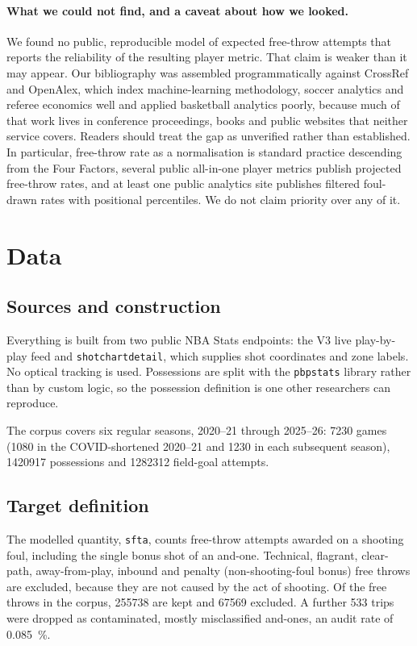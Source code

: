 \documentclass[11pt,letterpaper]{article}
\begin{document}
\paragraph{What we could not find, and a caveat about how we looked.}
We found no public, reproducible model of expected free-throw attempts that
reports the reliability of the resulting player metric. That claim is weaker than
it may appear. Our bibliography was assembled programmatically against CrossRef
and OpenAlex, which index machine-learning methodology, soccer analytics and
referee economics well and applied basketball analytics poorly, because much of
that work lives in conference proceedings, books and public websites that
neither service covers. Readers should treat the gap as unverified rather than
established. In particular, free-throw rate as a normalisation is standard
practice descending from the Four Factors, several public all-in-one player
metrics publish projected free-throw rates, and at least one public analytics
site publishes filtered foul-drawn rates with positional percentiles. We do not
claim priority over any of it.

\section{Data}

\subsection{Sources and construction}

Everything is built from two public NBA Stats endpoints: the V3 live
play-by-play feed and \texttt{shotchartdetail}, which supplies shot coordinates
and zone labels. No optical tracking is used. Possessions are split with the
\texttt{pbpstats} library rather than by custom logic, so the possession
definition is one other researchers can reproduce.

The corpus covers six regular seasons, 2020--21 through 2025--26: \num{7230}
games (\num{1080} in the COVID-shortened 2020--21 and \num{1230} in each
subsequent season), \num{1420917} possessions and \num{1282312} field-goal
attempts.

\subsection{Target definition}

The modelled quantity, \texttt{sfta}, counts free-throw attempts awarded on a
shooting foul, including the single bonus shot of an and-one. Technical,
flagrant, clear-path, away-from-play, inbound and penalty (non-shooting-foul
bonus) free throws are excluded, because they are not caused by the act of
shooting. Of the free throws in the corpus, \num{255738} are kept and \num{67569}
excluded. A further 533 trips were dropped as contaminated, mostly misclassified
and-ones, an audit rate of \SI{0.085}{\percent}.
\end{document}
